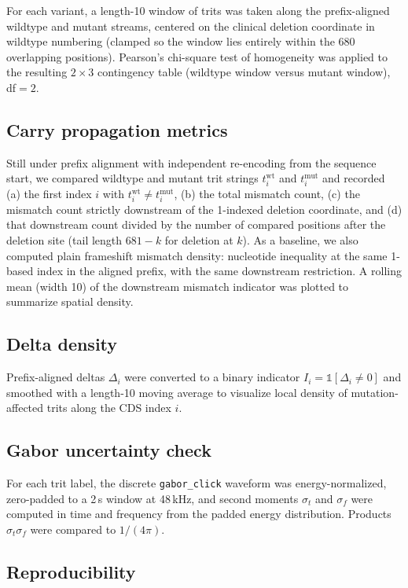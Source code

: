 \documentclass[preprint,12pt]{elsarticle}
\begin{document}
For each variant, a length-10 window of trits was taken along the prefix-aligned wildtype and mutant streams, centered on the clinical deletion coordinate in wildtype numbering (clamped so the window lies entirely within the 680 overlapping positions). Pearson's chi-square test of homogeneity was applied to the resulting $2\times 3$ contingency table (wildtype window versus mutant window), df$=2$.

\subsection{Carry propagation metrics}

Still under prefix alignment with independent re-encoding from the sequence start, we compared wildtype and mutant trit strings $t^{\mathrm{wt}}_i$ and $t^{\mathrm{mut}}_i$ and recorded (a) the first index $i$ with $t^{\mathrm{wt}}_i\neq t^{\mathrm{mut}}_i$, (b) the total mismatch count, (c) the mismatch count strictly downstream of the 1-indexed deletion coordinate, and (d) that downstream count divided by the number of compared positions after the deletion site (tail length $681-k$ for deletion at $k$). As a baseline, we also computed plain frameshift mismatch density: nucleotide inequality at the same 1-based index in the aligned prefix, with the same downstream restriction. A rolling mean (width 10) of the downstream mismatch indicator was plotted to summarize spatial density.

\subsection{Delta density}

Prefix-aligned deltas $\Delta_i$ were converted to a binary indicator $I_i=\mathbb{1}[\Delta_i\neq 0]$ and smoothed with a length-10 moving average to visualize local density of mutation-affected trits along the CDS index $i$.

\subsection{Gabor uncertainty check}

For each trit label, the discrete \texttt{gabor\_click} waveform was energy-normalized, zero-padded to a 2\,s window at 48\,kHz, and second moments $\sigma_t$ and $\sigma_f$ were computed in time and frequency from the padded energy distribution. Products $\sigma_t\sigma_f$ were compared to $1/(4\pi)$.

\subsection{Reproducibility}
\end{document}
